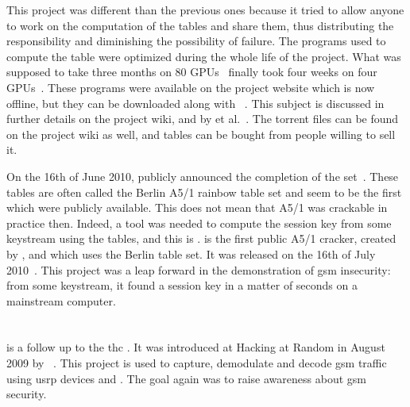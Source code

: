 {{      This project was different than the previous ones because it tried
      to allow anyone to work on the computation of the tables and share
      them, thus distributing the responsibility and diminishing the
      possibility of failure. The programs used to compute the table
      were optimized during the whole life of the project. What was
      supposed to take three months on 80 GPUs~\cite{nohl_gsm:_2009}
      finally took four weeks on four GPUs~\cite{nohl_breaking_2010}.
      These programs were available on the project website which is now
      offline, but they can be downloaded along with
      ~\cite{kraken_????}. This subject is discussed in
      further details on the project wiki, and by  et
      al.~\cite{glendrange_decoding_2010,srlabs_wiki_????}. The torrent
      files can be found on the project wiki as well, and tables can be
      bought from people willing to sell it.

      On the 16th of June 2010,  publicly
      announced the completion of the set~\cite{stevenson_[a51]_2010-1}.
      These tables are often called the Berlin A5/1 rainbow table set
      and seem to be the first which were publicly available. This does
      not mean that A5/1 was crackable in practice then. Indeed, a tool
      was needed to compute the session key from some keystream using
      the tables, and this is .  is the first
      public A5/1 cracker, created by , and
      which uses the Berlin table set. It was released on the 16th of
      July 2010~\cite{stevenson_[a51]_2010}. This project was a leap
      forward in the demonstration of \gls{gsm} insecurity: from some
      keystream, it found a session key in a matter of seconds on a
      mainstream computer.
      
    \section{}
    \label{sec:airprobe}

       is a follow up to the \gls{thc} . It was introduced at Hacking at Random in August 2009 by
      ~\cite{welte_airprobe:_2009,airprobe_????}.
      This project is used to capture, demodulate and decode \gls{gsm}
      traffic using \gls{usrp} devices and . The goal
      again was to raise awareness about \gls{gsm} security.

}}
